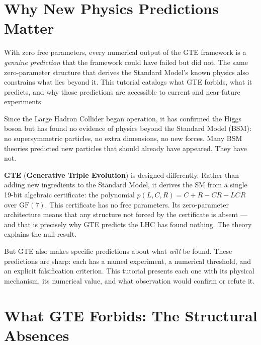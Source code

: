 \documentclass[11pt,a4paper]{article}
\newcommand{\term}[1]{\textbf{#1}}
\begin{document}
\section{Why New Physics Predictions Matter}
\label{sec:intro}

\begin{tcolorbox}[colback=boxblue,colframe=blue!40!black,
  title=The core argument]
With zero free parameters, every numerical output of the GTE framework is a
\emph{genuine prediction} that the framework could have failed but did not.
The same zero-parameter structure that derives the Standard Model's known
physics also constrains what lies beyond it.  This tutorial catalogs what
GTE forbids, what it predicts, and why those predictions are accessible to
current and near-future experiments.
\end{tcolorbox}

Since the Large Hadron Collider began operation, it has confirmed the Higgs
boson but has found no evidence of physics beyond the Standard Model (BSM):
no supersymmetric particles, no extra dimensions, no new forces.  Many BSM
theories predicted new particles that should already have appeared.  They have not.

\term{GTE} (\term{Generative Triple Evolution}) is designed differently.  Rather
than adding new ingredients to the Standard Model, it derives the SM from a
single 19-bit algebraic certificate: the polynomial
$p(L,C,R) = C + R - CR - LCR$ over $\mathrm{GF}(7)$.  This certificate has no
free parameters.  Its zero-parameter architecture means that any structure not
forced by the certificate is absent — and that is precisely why GTE predicts
the LHC has found nothing.  The theory explains the null result.

But GTE also makes specific predictions about what \emph{will} be found.  These
predictions are sharp: each has a named experiment, a numerical threshold, and
an explicit falsification criterion.  This tutorial presents each one with its
physical mechanism, its numerical value, and what observation would confirm or
refute it.

\section{What GTE Forbids: The Structural Absences}
\label{sec:forbidden}
\end{document}
